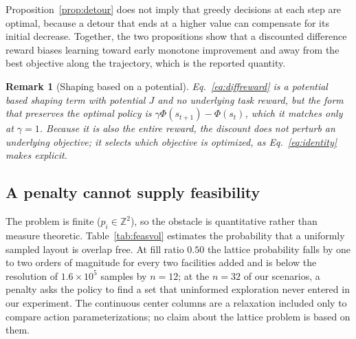 \documentclass[preprint,12pt,authoryear]{elsarticle}
\newtheorem{rem}{Remark}
\begin{document}
Proposition~\ref{prop:detour} does not imply that greedy decisions at each step
are optimal, because a detour that ends at a higher value can compensate for its
initial decrease. Together, the two propositions show that a discounted
difference reward biases learning toward early monotone improvement and away
from the best objective along the trajectory, which is the reported quantity.

\begin{rem}[Shaping based on a potential]
Eq.~\eqref{eq:diffreward} is a potential based shaping term \citep{Ng1999Shaping}
with potential $J$ and no underlying task reward, but the form that preserves the optimal policy
is $\gamma\Phi(s_{t+1})-\Phi(s_t)$, which it matches only at $\gamma=1$.
Because it is also the entire reward, the discount does not perturb an
underlying objective; it selects which objective is optimized, as
Eq.~\eqref{eq:identity} makes explicit.
\end{rem}

\subsection{A penalty cannot supply feasibility}
The problem is finite ($p_i\in\mathbb Z^2$), so the obstacle is quantitative
rather than measure theoretic. Table~\ref{tab:feasvol} estimates the
probability that a uniformly sampled layout is overlap free. At fill ratio
$0.50$ the lattice probability falls by one to two orders of magnitude for
every two facilities added and is below the resolution of $1.6\times10^5$
samples by $n=12$; at the $n=32$ of our scenarios, a penalty asks the policy
to find a set that uninformed exploration never entered in our experiment. The
continuous center columns are a relaxation included only to compare action
parameterizations; no claim about the lattice problem is based on them.
\end{document}
